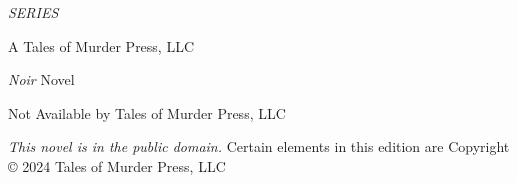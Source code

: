 \documentclass{novel}
\begin{document}
\begin{parascale}[1]
\centering\textit{SERIES}\par
\vspace*{3\nbs}
\par
\end{parascale}
\vfill
\begin{parascale}[1]

A Tales of Murder Press, LLC\par
\textit{Noir} Novel\par
\end{parascale}
\clearpage
\thispagestyle{empty}
\null\vfill
{} Not Available by Tales of Murder Press, LLC\par
\null\null
{}\par
\null\null
\vfill
\begin{adjustwidth}{3em}{3em}
\textit{This novel is in the public domain.} Certain \mbox{elements} in this edition are Copyright © 2024 Tales of Murder Press, LLC
\end{adjustwidth}
\clearpage
\thispagestyle{empty}
\clearpage %
\thispagestyle{empty}
\end{document}
